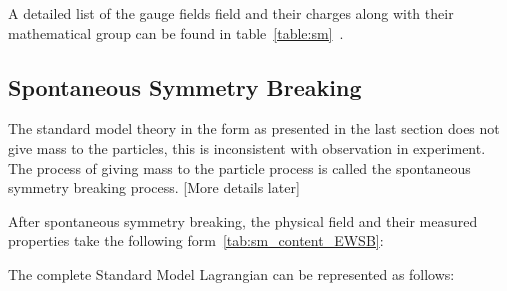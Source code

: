 

A detailed list of the gauge fields field and their charges along with their mathematical group can be found in table~\ref{table:sm}~\cite{Antrim:2699575}. 

\subsection*{Spontaneous Symmetry Breaking}
The standard model theory in the form as presented in the last section does not give mass to the particles, this is inconsistent with observation in experiment. The process of giving mass to the particle process is called the spontaneous symmetry breaking process.
[More details later]



After spontaneous symmetry breaking, the physical field and their measured properties take the following form~\ref{tab:sm_content_EWSB}:
    
    The complete Standard Model Lagrangian can be represented as follows:

